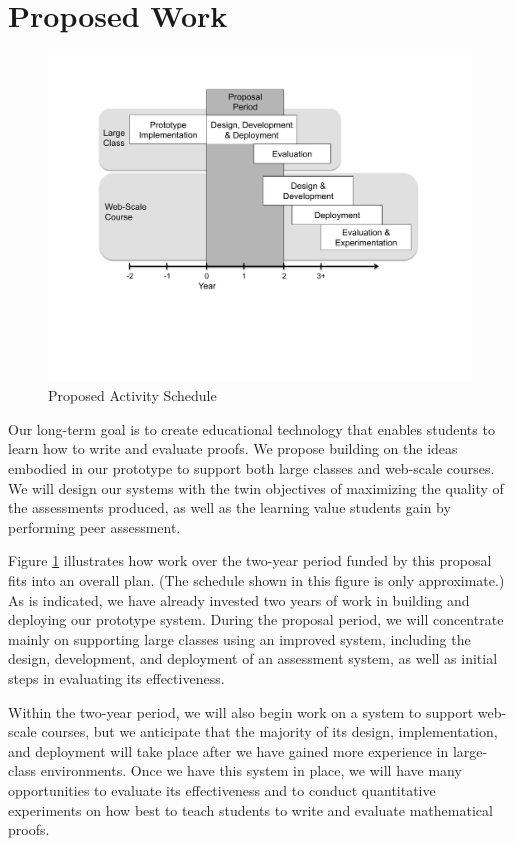 \documentclass[12pt]{article}
\begin{document}
\section{Proposed Work}

\begin{figure}[ht]
\begin{center}
\includegraphics[scale=0.7]{schedule}
\end{center}
\caption{Proposed Activity Schedule}
\label{fig:schedule}
\end{figure}


Our long-term goal is to create educational technology that enables
students to learn how to write and evaluate proofs.  We propose
building on the ideas embodied in our prototype to support both large
classes and web-scale courses.  We will design our systems with the
twin objectives of maximizing the quality of the assessments produced, as
well as the learning value students gain by performing peer assessment.

Figure \ref{fig:schedule} illustrates how work over the two-year
period funded by this proposal fits into an overall plan.  (The
schedule shown in this figure is only approximate.)  As is indicated,
we have already invested two years of work in building and deploying
our prototype system.  During the proposal period, we will concentrate
mainly on supporting large classes using an improved system, including
the design, development, and deployment of an assessment system,
as well as initial steps in evaluating its
effectiveness.

Within the two-year period,
we will also begin work on a system to support
web-scale courses, but we anticipate that the majority of its design,
implementation, and deployment will take place after we
have gained more experience in large-class environments.  Once we have
this system in place, we will have many opportunities to evaluate its
effectiveness and to conduct quantitative experiments on how best to
teach students to write and evaluate mathematical proofs.
\end{document}
